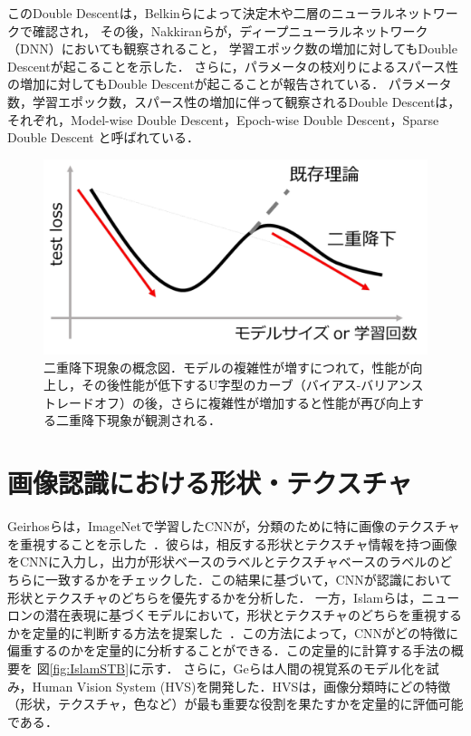 このDouble Descentは，Belkinら\cite{Belkin_2019}によって決定木や二層のニューラルネットワークで確認され，
その後，Nakkiranら\cite{nakkiran2021deep}が，ディープニューラルネットワーク（DNN）においても観察されること，
学習エポック数の増加に対してもDouble Descentが起こることを示した．
さらに，パラメータの枝刈りによるスパース性の増加に対してもDouble Descentが起こることが報告されている\cite{He}．
パラメータ数，学習エポック数，スパース性の増加に伴って観察されるDouble Descentは，
それぞれ，Model-wise Double Descent，Epoch-wise Double Descent，Sparse Double Descent と呼ばれている\cite{nakkiran2021deep,He}．

\begin{figure}[h]
    \centering
    \includegraphics[width=\linewidth]{fig/doubledescent.pdf}
    \caption[二重降下現象の概念図．]{二重降下現象の概念図．モデルの複雑性が増すにつれて，性能が向上し，その後性能が低下するU字型のカーブ（バイアス-バリアンス トレードオフ）の後，さらに複雑性が増加すると性能が再び向上する二重降下現象が観測される．}
    \label{fig:DoubleDescent}
\end{figure}

\section{画像認識における形状・テクスチャ}
Geirhosらは，ImageNetで学習したCNNが，分類のために特に画像のテクスチャを重視することを示した~\cite{Geirhos}．彼らは，相反する形状とテクスチャ情報を持つ画像をCNNに入力し，出力が形状ベースのラベルとテクスチャベースのラベルのどちらに一致するかをチェックした．この結果に基づいて，CNNが認識において形状とテクスチャのどちらを優先するかを分析した．
一方，Islamらは，ニューロンの潜在表現に基づくモデルにおいて，形状とテクスチャのどちらを重視するかを定量的に判断する方法を提案した~\cite{Islam}．この方法によって，CNNがどの特徴に偏重するのかを定量的に分析することができる．この定量的に計算する手法の概要を
図\ref{fig:IslamSTB}に示す．
さらに，Geらは人間の視覚系のモデル化を試み，Human Vision System (HVS)を開発した．HVSは，画像分類時にどの特徴（形状，テクスチャ，色など）が最も重要な役割を果たすかを定量的に評価可能である\cite{Ge}．

